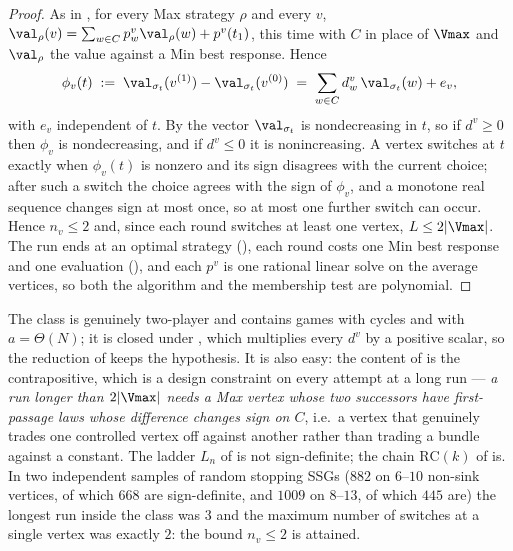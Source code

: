 \begin{proof}
As in , for every Max strategy $\rho$ and every $v$,
$\val_\rho(v)=\sum_{w\in C}p^{v}_w\val_\rho(w)+p^{v}(t_1)$, this time with $C$ in
place of $\Vmax$ and $\val_\rho$ the value against a Min best response. Hence
\[
  \phi_v(t)\;:=\;\val_{\sigma_t}(v^{(1)})-\val_{\sigma_t}(v^{(0)})
  \;=\;\sum_{w\in C}d^{v}_w\,\val_{\sigma_t}(w)+e_v ,
\]
with $e_v$ independent of $t$. By  the vector $\val_{\sigma_t}$ is
nondecreasing in $t$, so if $d^{v}\ge0$ then $\phi_v$ is nondecreasing, and if
$d^{v}\le0$ it is nonincreasing. A vertex switches at $t$ exactly when $\phi_v(t)$ is
nonzero and its sign disagrees with the current choice; after such a switch the choice
agrees with the sign of $\phi_v$, and a monotone real sequence changes sign at most
once, so at most one further switch can occur. Hence $n_v\le2$ and, since each round
switches at least one vertex, $L\le2|\Vmax|$. The run ends at an optimal strategy
(), each round costs one Min best response and one evaluation
(), and each $p^{v}$ is one rational linear solve on the
average vertices, so both the algorithm and the membership test are polynomial.
\end{proof}

\begin{remark}\label{oph:signdef-scope}
The class is genuinely two-player and contains games with cycles and with
$a=\Theta(N)$; it is closed under , which multiplies every $d^{v}$
by a positive scalar, so the reduction of  keeps the
hypothesis. It is also easy: the content of  is the contrapositive,
which is a design constraint on every attempt at a long run --- \emph{a run longer than
$2|\Vmax|$ needs a Max vertex whose two successors have first-passage laws whose
difference changes sign on $C$}, i.e.\ a vertex that genuinely trades one controlled
vertex off against another rather than trading a bundle against a constant. The
ladder $L_n$ of  is not sign-definite; the chain $\mathrm{RC}(k)$ of
 is. In two independent samples of random stopping SSGs
($882$ on $6$--$10$ non-sink vertices, of which $668$ are sign-definite, and $1009$ on
$8$--$13$, of which $445$ are) the longest run inside the class was $3$ and the
maximum number of switches at a single vertex was exactly $2$: the bound $n_v\le2$ is
attained.
\end{remark}


